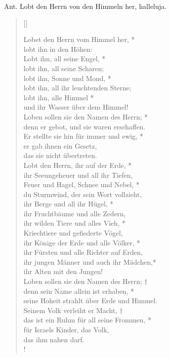 \medskip

\begin{sloppypar}
{\noindent\rm{Ant. Lobt den Herrn von den Himmeln her, halleluja.}}
\end{sloppypar}

\medskip


\begin{verse}[\versewidth]

Lobet den Herrn vom Himmel her, *\\
lobt ihn in den Höhen:\\
\vin Lobt ihn, all seine Engel, *\\
\vin lobt ihn, all seine Scharen;\\
lobt ihn, Sonne und Mond, *\\
lobt ihn, all ihr leuchtenden Sterne;\\
\vin lobt ihn, alle Himmel *\\
\vin und ihr Wasser über dem Himmel!\\
Loben sollen sie den Namen des Herrn; *\\
denn er gebot, und sie waren erschaffen.\\
\vin Er stellte sie hin für immer und ewig, *\\
\vin er gab ihnen ein Gesetz,\\
\vin das sie nicht übertreten.\\
Lobt den Herrn, ihr auf der Erde, *\\
ihr Seeungeheuer und all ihr Tiefen,\\
\vin Feuer und Hagel, Schnee und Nebel, *\\
\vin du Sturmwind, der sein Wort vollzieht,\\
ihr Berge und all ihr Hügel, *\\
ihr Fruchtbäume und alle Zedern,\\
\vin ihr wilden Tiere und alles Vieh, *\\
\vin Kriechtiere und gefiederte Vögel,\\
ihr Könige der Erde und alle Völker, *\\
ihr Fürsten und alle Richter auf Erden,\\
\vin ihr jungen Männer und auch ihr Mädchen,*\\
\vin ihr Alten mit den Jungen!\\
Loben sollen sie den Namen des Herrn; †\\
denn sein Name allein ist erhaben, *\\
seine Hoheit strahlt über Erde und Himmel.\\
\vin Seinem Volk verleiht er Macht, †\\
\vin das ist ein Ruhm für all seine Frommen, *\\
\vin für Israels Kinder, das Volk,\\
\vin das ihm nahen darf.\\!
\end{verse}

